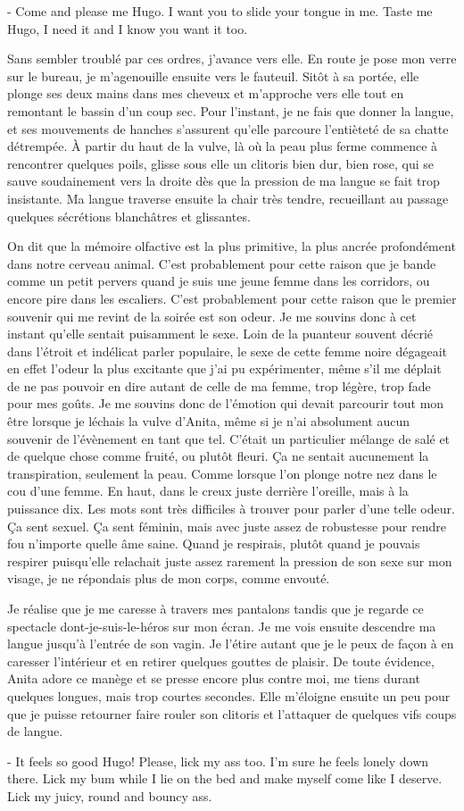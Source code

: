 - Come and please me Hugo. I want you to slide your tongue in me. Taste me Hugo, I need it and I know you want it too.

Sans sembler troublé par ces ordres, j'avance vers elle. En route je pose mon verre sur le bureau, je m'agenouille ensuite vers le fauteuil. Sitôt à sa portée, elle plonge ses deux mains dans mes cheveux et m'approche vers elle tout en remontant le bassin d'un coup sec. Pour l'instant, je ne fais que donner la langue, et ses mouvements de hanches s'assurent qu'elle parcoure  l'entièteté de sa chatte détrempée. À partir du haut de la vulve, là où la peau plus ferme commence à rencontrer quelques poils, glisse sous elle un clitoris bien dur, bien rose, qui se sauve soudainement vers la droite dès que la pression de ma langue se fait trop insistante. Ma langue traverse ensuite la chair très tendre, recueillant au passage quelques sécrétions blanchâtres et glissantes.

On dit que la mémoire olfactive est la plus primitive, la plus ancrée profondément dans notre cerveau animal. C'est probablement pour cette raison que je bande comme un petit pervers quand je suis une jeune femme dans les corridors, ou encore pire dans les escaliers. C'est probablement pour cette raison que le premier souvenir qui me revint de la soirée est son odeur. Je me souvins donc à cet instant qu'elle sentait puisamment le sexe. Loin de la puanteur souvent décrié dans l'étroit et indélicat parler populaire, le sexe de cette femme noire dégageait en effet l'odeur la plus excitante que j'ai pu expérimenter,  même s'il me déplait de ne pas pouvoir en dire autant de celle de ma femme, trop légère, trop fade pour mes goûts. Je me souvins donc de l'émotion qui devait parcourir tout mon être lorsque je léchais la vulve d'Anita, même si je n'ai absolument aucun souvenir de l'évènement en tant que tel. C'était un particulier mélange de salé et de quelque chose comme fruité, ou plutôt fleuri.  Ça ne sentait aucunement la transpiration, seulement la peau. Comme lorsque l'on plonge notre nez dans le cou d'une femme. En haut, dans le creux juste derrière l'oreille, mais à la puissance dix. Les mots sont très difficiles à trouver pour parler d'une telle odeur. Ça sent sexuel. Ça sent féminin, mais avec juste assez de robustesse pour rendre fou n'importe quelle âme saine. Quand je respirais, plutôt quand je pouvais respirer puisqu'elle relachait juste assez rarement la pression de son sexe sur mon visage, je ne répondais plus de mon corps, comme envouté.

Je réalise que je me caresse à travers mes pantalons tandis que je regarde ce spectacle dont-je-suis-le-héros sur mon écran. Je me vois ensuite descendre ma langue jusqu'à l'entrée de son vagin. Je l'étire autant que je le peux de façon à en caresser l'intérieur et en retirer quelques gouttes de plaisir. De toute évidence, Anita adore ce manège et se presse encore plus contre moi, me tiens durant quelques longues, mais trop courtes secondes. Elle m'éloigne ensuite un peu pour que je puisse retourner faire rouler son clitoris et l'attaquer de quelques vifs coups de langue.

- It feels so good Hugo! Please, lick my ass too. I'm sure he feels
  lonely down there. Lick my bum while I lie on the bed and make
  myself come like I deserve. Lick my juicy, round and bouncy ass.


